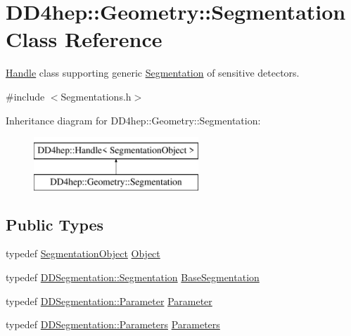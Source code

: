 \hypertarget{class_d_d4hep_1_1_geometry_1_1_segmentation}{}\section{D\+D4hep\+:\+:Geometry\+:\+:Segmentation Class Reference}
\label{class_d_d4hep_1_1_geometry_1_1_segmentation}


\hyperlink{class_d_d4hep_1_1_handle}{Handle} class supporting generic \hyperlink{class_d_d4hep_1_1_geometry_1_1_segmentation}{Segmentation} of sensitive detectors.  




{\ttfamily \#include $<$Segmentations.\+h$>$}

Inheritance diagram for D\+D4hep\+:\+:Geometry\+:\+:Segmentation\+:\begin{figure}[H]
\begin{center}
\leavevmode
\includegraphics[height=2.000000cm]{class_d_d4hep_1_1_geometry_1_1_segmentation}
\end{center}
\end{figure}
\subsection*{Public Types}
\begin{DoxyCompactItemize}
\item 
typedef \hyperlink{class_d_d4hep_1_1_geometry_1_1_segmentation_object}{Segmentation\+Object} \hyperlink{class_d_d4hep_1_1_geometry_1_1_segmentation_a91154cc3b58985ac86388d00572ee48f}{Object}
\item 
typedef \hyperlink{class_d_d4hep_1_1_d_d_segmentation_1_1_segmentation}{D\+D\+Segmentation\+::\+Segmentation} \hyperlink{class_d_d4hep_1_1_geometry_1_1_segmentation_a50fcd62c91daf63c26a333d1ee51b192}{Base\+Segmentation}
\item 
typedef \hyperlink{namespace_d_d4hep_1_1_d_d_segmentation_af6c6bad2a745d807a0ed00506fb34ccf}{D\+D\+Segmentation\+::\+Parameter} \hyperlink{class_d_d4hep_1_1_geometry_1_1_segmentation_a179c843c1bc64eabb85be55e2538be19}{Parameter}
\item 
typedef \hyperlink{namespace_d_d4hep_1_1_d_d_segmentation_af38026430ca0e1ef64acdfc898f5dd3d}{D\+D\+Segmentation\+::\+Parameters} \hyperlink{class_d_d4hep_1_1_geometry_1_1_segmentation_af7d9af7b574fa9039f44befc61b7e46f}{Parameters}
\end{DoxyCompactItemize}
